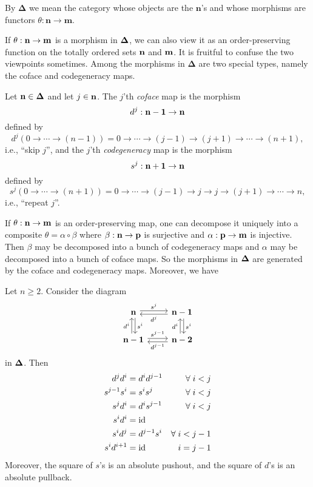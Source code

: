 \begin{definition}
\label{def:order category}
By $\mathbf{\Delta}$ we mean the category whose objects are the $\mathbf{n}$'s and whose morphisms are functors $\theta : \mathbf{n} \to \mathbf{m}$.
\end{definition}
If $\theta : \bf{n} \to \bf{m}$ is a morphism in $\bf{\Delta}$, we can also view it as an order-preserving function on the totally ordered sets $\bf{n}$ and $\bf{m}$. It is fruitful to confuse the two viewpoints sometimes.
Among the morphisms in $\mathbf{\Delta}$ are two special types, namely the coface and codegeneracy maps.
\begin{definition}
\label{def:coface and codegeneracy maps}
Let $\bf{n} \in \bf{\Delta}$ and let $j \in \bf{n}$. The $j$'th \emph{coface} map is the morphism
\[ d^j : \bf{n-1} \to \bf{n} \]
defined by
\[ d^j\left(0 \to \cdots \to (n-1) \right) = 0 \to \cdots \to (j-1) \to (j+1) \to \cdots \to (n+1), \]
i.e., ``skip $j$'', and the $j$'th \emph{codegeneracy} map is the morphism
\[ s^j : \bf{n+1} \to \bf{n} \]
defined by
\[ s^j\left(0 \to \cdots \to (n+1) \right) = 0 \to \cdots \to (j-1) \to j \to j \to (j+1) \to \cdots \to n, \]
i.e., ``repeat $j$''.
\end{definition}
If $\theta : \bf{n} \to \bf{m}$ is an order-preserving map, one can decompose it uniquely into a composite $\theta = \alpha \circ \beta$ where $\beta : \bf{n} \to \bf{p}$ is surjective and $\alpha : \bf{p} \to \bf{m}$ is injective. Then $\beta$ may be decomposed into a bunch of codegeneracy maps and $\alpha$ may be decomposed into a bunch of coface maps. So the morphisms in $\bf{\Delta}$ are generated by the coface and codegeneracy maps. Moreover, we have
\begin{lemma}
\label{lem:cosimplicial identities}
Let $n \geq 2$. Consider the diagram
\[ \begin{tikzcd}
\bf{n} \arrow[shift left=0.2em]{r}{s^j} \arrow[shift left=0.2em]{d}{s^i} & \bf{n-1} \arrow[shift left=0.2em]{l}{d^j} \arrow[shift left=0.2em]{d}{s^i} \\
\bf{n-1} \arrow[shift left=0.2em]{u}{d^i} \arrow[shift left=0.2em]{r}{s^{j-1}} & \bf{n-2} \arrow[shift left=0.2em]{u}{d^i} \arrow[shift left=0.2em]{l}{d^{j-1}}
\end{tikzcd} \]
in $\bf{\Delta}$. Then
\begin{align*}
d^j d^i &= d^i d^{j-1} & \forall \; i < j \\
s^{j-1} s^i &= s^i s^j & \forall \; i < j \\
s^j d^i &= d^i s^{j-1} & \forall \; i < j \\
s^i d^i &= \operatorname{id} & \; \\
s^i d^j &= d^{j-1} s^i & \forall \; i < j-1 \\
s^i d^{i+1} &= \operatorname{id} & i=j-1
\end{align*}
Moreover, the square of $s$'s is an absolute pushout, and the square of $d$'s is an absolute pullback.
\end{lemma}
